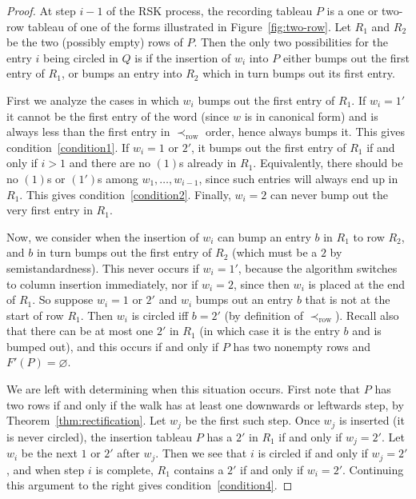 \documentclass[ALCO,ThmDefs,Unicode,epreuves]{cedram}
\DeclareMathOperator{\row}{row}
\begin{document}
\begin{proof}
At step $i-1$ of the RSK process, the recording tableau $P$ is a one or two-row tableau of one of the forms illustrated in Figure~\ref{fig:two-row}. Let $R_1$ and $R_2$ be the two (possibly empty) rows of $P$. Then the only two possibilities for the entry $i$ being circled in $Q$ is if the insertion of $w_i$ into $P$ either bumps out the first entry of $R_1$, or bumps an entry into $R_2$ which in turn bumps out its first entry.

First we analyze the cases in which $w_i$ bumps out the first entry of $R_1$. If $w_i=1'$ it cannot be the first entry of the word (since $w$ is in canonical form) and is always less than the first entry in $\prec_{\row }$ order, hence always bumps it. This gives condition~\ref{condition1}. If $w_i=1$ or $2'$, it bumps out the first entry of $R_1$ if and only if $i>1$ and there are no $(1)$s already in $R_1$. Equivalently, there should be no $(1)$s or $(1')$s among $w_1, \ldots, w_{i-1}$, since such entries will always end up in $R_1$. This gives condition~\ref{condition2}. Finally, $w_i=2$ can never bump out the very first entry in $R_1$. 

Now, we consider when the insertion of $w_i$ can bump an entry $b$ in $R_1$ to row $R_2$, and $b$ in turn bumps out the first entry of $R_2$ (which must be a $2$ by semistandardness). This never occurs if $w_i=1'$, because the algorithm switches to column insertion immediately, nor if $w_i=2$, since then $w_i$ is placed at the end of $R_1$. So suppose $w_i=1$ or $2'$ and $w_i$ bumps out an entry $b$ that is not at the start of row $R_1$. Then $w_i$ is circled iff $b=2'$ (by definition of $\prec_{\row }$).
Recall also that there can be at most one $2'$ in $R_1$ (in which case it is the entry $b$ and is bumped out), and this occurs if and only if $P$ has two nonempty rows and $F'(P)=\varnothing$.

We are left with determining when this situation occurs. First note that $P$ has two rows if and only if the walk has at least one downwards or leftwards step, by Theorem~\ref{thm:rectification}. Let $w_j$ be the first such step. Once $w_j$ is inserted (it is never circled), the insertion tableau $P$ has a $2'$ in $R_1$ if and only if $w_j=2'$. Let $w_i$ be the next $1$ or $2'$ after $w_j$. Then we see that $i$ is circled if and only if $w_j=2'$, and when step $i$ is complete, $R_1$ contains a $2'$ if and only if $w_i=2'$. Continuing this argument to the right gives condition~\ref{condition4}.
\end{proof}
\end{document}
